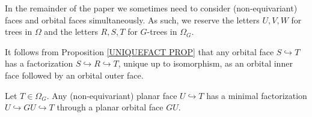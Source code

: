 \documentclass[a4paper,10pt
]{article}%
\begin{document}
\begin{notation}\label{TREEDIFNOT NOT}
	In the remainder of the paper we sometimes need to consider (non-equivariant) faces and orbital faces simultaneously.
	As such, we reserve the letters $U,V,W$ for trees in $\Omega$
	and the letters $R,S,T$ for $G$-trees in $\Omega_G$.
\end{notation}


\begin{remark}\label{INNOUTORB REM}
	It follows from Proposition \ref{UNIQUEFACT PROP} that any orbital face $S \hookrightarrow T$ has a factorization
	$S \hookrightarrow R \hookrightarrow T$, unique up to isomorphism, as an orbital inner face followed by an orbital outer face.	
\end{remark}


\begin{proposition}\label{MINGFACT PROP}
	Let $T \in \Omega_G$.
	Any (non-equivariant) planar face $U \hookrightarrow T$ has a minimal factorization
	$U \hookrightarrow GU \hookrightarrow T$
	through a planar orbital face $GU$.
\end{proposition}
\end{document}
